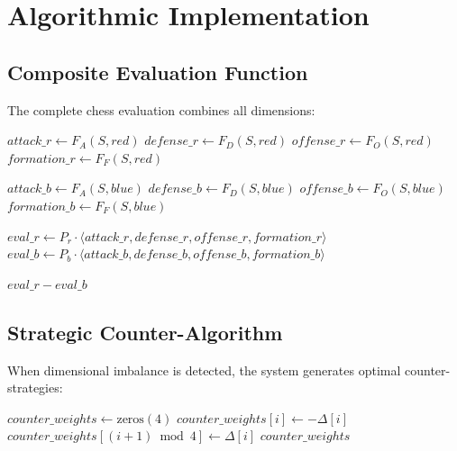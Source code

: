 \documentclass[12pt,a4paper]{article}
\begin{document}
\section{Algorithmic Implementation}

\subsection{Composite Evaluation Function}

The complete chess evaluation combines all dimensions:

\begin{algorithm}[H]
\caption{Chess DGT Evaluation}
\begin{algorithmic}
    \State $attack\_r \leftarrow F_A(S, red)$
    \State $defense\_r \leftarrow F_D(S, red)$
    \State $offense\_r \leftarrow F_O(S, red)$
    \State $formation\_r \leftarrow F_F(S, red)$
    
    \State $attack\_b \leftarrow F_A(S, blue)$
    \State $defense\_b \leftarrow F_D(S, blue)$
    \State $offense\_b \leftarrow F_O(S, blue)$
    \State $formation\_b \leftarrow F_F(S, blue)$
    
    \State $eval\_r \leftarrow P_r \cdot \langle attack\_r, defense\_r, offense\_r, formation\_r \rangle$
    \State $eval\_b \leftarrow P_b \cdot \langle attack\_b, defense\_b, offense\_b, formation\_b \rangle$
    
    \State \Return $eval\_r - eval\_b$
\EndFunction
\end{algorithmic}
\end{algorithm}

\subsection{Strategic Counter-Algorithm}

When dimensional imbalance is detected, the system generates optimal counter-strategies:

\begin{algorithm}[H]
\caption{Counter-Strategy Generation}
\begin{algorithmic}
    \State $counter\_weights \leftarrow \text{zeros}(4)$
         
            \State $counter\_weights[i] \leftarrow -\Delta[i]$ 
            \State $counter\_weights[(i+1) \bmod 4] \leftarrow \Delta[i]$ 
        \EndIf
    \EndFor
    \State \Return $counter\_weights$
\EndFunction
\end{algorithmic}
\end{algorithm}
\end{document}
